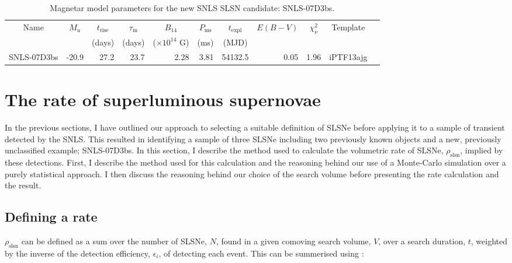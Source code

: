 \begin{table}
\begin{center}
\caption{Magnetar model parameters for the new SNLS SLSN candidate: SNLS-07D3bs.}
\label{tab:07d3bsParams}
\begin{tabular}{|l|r|r|r|r|r|r|r|r|r|r|}
\hline
  \multicolumn{1}{|c|}{Name} &
  \multicolumn{1}{c|}{$M_u$} &
  \multicolumn{1}{c|}{$t_\mathrm{rise}$} &
  \multicolumn{1}{c|}{$\tau_\mathrm{m}$} &
  \multicolumn{1}{c|}{$B_{14}$} &
  \multicolumn{1}{c|}{$P_{\mathrm{ms}}$} &
  \multicolumn{1}{c|}{$t_\mathrm{expl}$} &
  \multicolumn{1}{c|}{$E(B-V)$} &
  \multicolumn{1}{c|}{$\chi^2_{\nu}$} &
  \multicolumn{1}{c|}{Template} \\ & &
  \multicolumn{1}{c|}{(days)} &
  \multicolumn{1}{c|}{(days)} &
  \multicolumn{1}{c|}{($\times10^{14}$ G)} &
  \multicolumn{1}{c|}{(ms)} &
  \multicolumn{1}{c|}{(MJD)} & \\
\hline
SNLS-07D3bs & -20.9 &  27.2 & 23.7 & 2.28 & 3.81 & 54132.5 & 0.05 & 1.96 & iPTF13ajg\\
\hline
\end{tabular}
\end{center}
\end{table}

\section{The rate of superluminous supernovae}
\label{sec:MC}
In the previous sections, I have outlined our approach to selecting a suitable definition of SLSNe before applying it to a sample of transient detected by the SNLS. This resulted in identifying a sample of three SLSNe including two previously known objects and a new, previously unclassified example; SNLS-07D3bs. In this section, I describe the method used to calculate the volumetric rate of SLSNe, $\rho_{\mathrm{slsn}}$, implied by these detections. First, I describe the method used for this calculation and the reasoning behind our use of a Monte-Carlo simulation over a purely statistical approach. I then discuss the reasoning behind our choice of the search volume before presenting the rate calculation and the result.

\subsection{Defining a rate}
\label{sec:method}
$\rho_{\mathrm{slsn}}$ can be defined as a sum over the number of SLSNe, $N$, found in a given comoving search volume, $V$, over a search duration, $t$, weighted by the inverse of the detection efficiency, $\epsilon_{i}$, of detecting each event. This can be summerised using :

